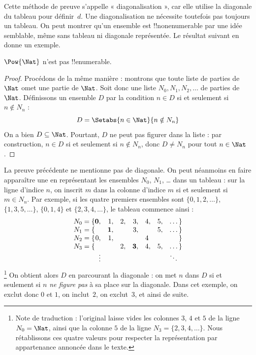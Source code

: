 \documentclass[11pt,a4paper,openany]{memoir}
\begin{document}
\begin{explain}
Cette méthode de preuve s'appelle « diagonalisation », car elle
utilise la diagonale du tableau pour définir~$d$. Une diagonalisation
ne nécessite toutefois pas toujours un tableau. On peut montrer
qu'un ensemble est !!{nonenumerable} par une idée semblable,
même sans tableau ni diagonale représentée. Le résultat suivant
en donne un exemple.
\end{explain}

\begin{thm}
$\Pow{\Nat}$ n'est pas !!{enumerable}.
\end{thm}

\begin{proof}
Procédons de la même manière : montrons que toute liste de parties
de~$\Nat$ omet une partie de $\Nat$. Soit donc une liste
$N_0, N_1, N_2, \ldots$ de parties de $\Nat$. Définissons
un ensemble $D$ par la condition $n \in D$ si et seulement si
$n \notin N_n$ :
\[
D = \Setabs{n \in \Nat}{n \notin N_n}
\]
On a bien $D\subseteq \Nat$. Pourtant, $D$ ne peut pas figurer
dans la liste : par construction, $n \in D$ si et seulement si
$n\notin N_n$, donc $D \neq N_n$ pour tout $n \in \Nat$.
\end{proof}

\begin{explain}
La preuve précédente ne mentionne pas de diagonale. On peut
néanmoins en faire apparaître une en représentant les ensembles
$N_0$, $N_1$, \dots{} dans un tableau : sur la ligne d'indice $n$,
on inscrit $m$ dans la colonne d'indice $m$ si et seulement si
$m \in N_n$. Par exemple, si les quatre premiers ensembles sont
$\{0,1,2,\dots\}$, $\{1, 3, 5, \dots\}$, $\{0,1,4\}$ et
$\{2,3,4,\dots\}$, le tableau commence ainsi :
\[
\begin{array}{r@{}rrrrrrr}
  N_0 = \{ & \mathbf{0}, & 1, & 2, & 3, & 4, & 5, & \dots\}\\
  N_1 = \{ &  & \mathbf{1}, &  & 3, &  & 5, & \dots\}\\
  N_2 = \{ & 0, & 1, &  &  & 4\phantom{,} &  & \}\\
  N_3 = \{ &  &  & 2, & \mathbf{3}, & 4, & 5, & \dots\}\\
  &\vdots & & & & & & \ddots\phantom{\}}
\end{array}
\]
\footnote{Note de traduction : l'original laisse vides les colonnes
$3$, $4$ et $5$ de la ligne $N_0=\Nat$, ainsi que la colonne $5$
de la ligne $N_3=\{2,3,4,\dots\}$. Nous rétablissons ces quatre
valeurs pour respecter la représentation par appartenance annoncée
dans le texte.}
On obtient alors $D$ en parcourant la diagonale : on met $n$
dans $D$ si et seulement si $n$ \emph{ne figure pas} à sa place
sur la diagonale. Dans cet exemple, on exclut donc $0$ et $1$,
on inclut~$2$, on exclut~$3$, et ainsi de suite.
\end{explain}
\end{document}
